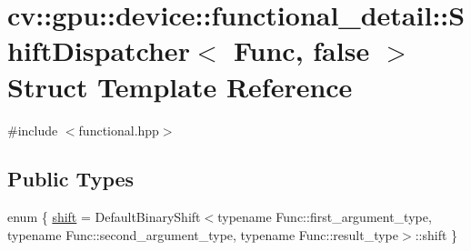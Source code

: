 \hypertarget{structcv_1_1gpu_1_1device_1_1functional__detail_1_1ShiftDispatcher_3_01Func_00_01false_01_4}{\section{cv\-:\-:gpu\-:\-:device\-:\-:functional\-\_\-detail\-:\-:Shift\-Dispatcher$<$ Func, false $>$ Struct Template Reference}
\label{structcv_1_1gpu_1_1device_1_1functional__detail_1_1ShiftDispatcher_3_01Func_00_01false_01_4}
}


{\ttfamily \#include $<$functional.\-hpp$>$}

\subsection*{Public Types}
\begin{DoxyCompactItemize}
\item 
enum \{ \hyperlink{structcv_1_1gpu_1_1device_1_1functional__detail_1_1ShiftDispatcher_3_01Func_00_01false_01_4_ae24faadd679f5db0034772d4c9377f42aa48bcd954ab4a8edab972ef91d8dd27a}{shift} = Default\-Binary\-Shift$<$typename Func\-:\-:first\-\_\-argument\-\_\-type, typename Func\-:\-:second\-\_\-argument\-\_\-type, typename Func\-:\-:result\-\_\-type$>$\-:\-:shift
 \}
\end{DoxyCompactItemize}


